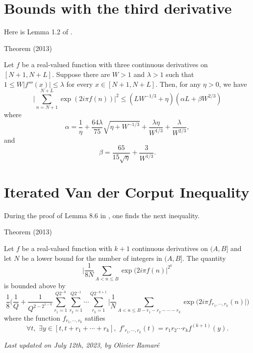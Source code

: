   
\par 
\section{Bounds with the third derivative}


Here is Lemma 1.2 of
\cite{Hiary*16}.
\par 
\begin{thm}{Theorem (2013)}

  Let $f$ be a real-valued function with three continuous derivatives
  on $[N+1, N+L]$. Suppose there are $W > 1$ and $\lambda > 1$ such
  that $1 \le W |f'''(x)| \le \lambda$ for every $x\in [N+1,
  N+L]$. Then, for any $\eta > 0$, we have
  $$
  \biggl|\sum_{n= N+1}^{N+L}
  \exp( 2i\pi f(n)) \biggr|^2
  \le (LW^{-1/3} +\eta) (\alpha L + \beta W^{2/3})
  $$
  where
  $$
  \alpha = \frac{1}{\eta} +\frac{64\lambda}{75}
  \sqrt{\eta + W^{-1/3}}+\frac{\lambda\eta}{W^{1/3}}
  +\frac{\lambda}{W^{2/3}},
  $$
  and
  $$
  \beta = \frac{65}{15\sqrt{\eta}} + \frac{3}{W^{1/3}}.
  $$
\end{thm}


  
\par 
\section{Iterated Van der Corput Inequality}


During the proof of Lemma 8.6 in 
  \cite{Granville-Ramare*96},
  one finds the next inequality.
\par 
\begin{thm}{Theorem (2013)}

  Let $f$ be a real-valued function with $k+1$ continuous derivatives
  on $(A, B]$ and let $N$ be a lower bound for the number of integers
  in $(A,B]$. The quantity
  $$
  \biggl|\frac{1}{8N}
  \sum_{A < n\le B} \exp(2 i \pi f(n)\biggr|^{2^k}
	    $$
	    is bounded above by
	    $$
	    \frac{1}{8}\biggl(
	    \frac{1}{Q} + \frac{1}{Q^{2-2^{1-k}}}
	    \sum_{r_1=1}^{Q2^{-0}}
	    \sum_{r_2=1}^{Q2^{-1}}
	    \cdots
	    \sum_{r_k=1}^{Q2^{-k+1}}
	    \biggl|
	    \frac{1}{N}
	    \sum_{A < n \le B-r_1-r_2-\cdots-r_k}
		    \exp(2i\pi f_{r_1,\cdots,r_k}(n)   
	    \biggr|
	    \biggr)
		      $$
		      where the function $f_{r_1,\cdots,r_k}$ satifies
		      $$
		      \forall t,\,\, \exists y\in[t, t+r_1+\cdots+r_k],
		      \,\,f'_{r_1,\cdots, r_k}(t)=r_1r_2\cdots r_k f^{(k+1)}(y).
		      $$
\end{thm}












  
\begin{flushright}\small\sl{}   Last updated on July 12th, 2023, by Olivier Ramar\'e
 \end{flushright}















